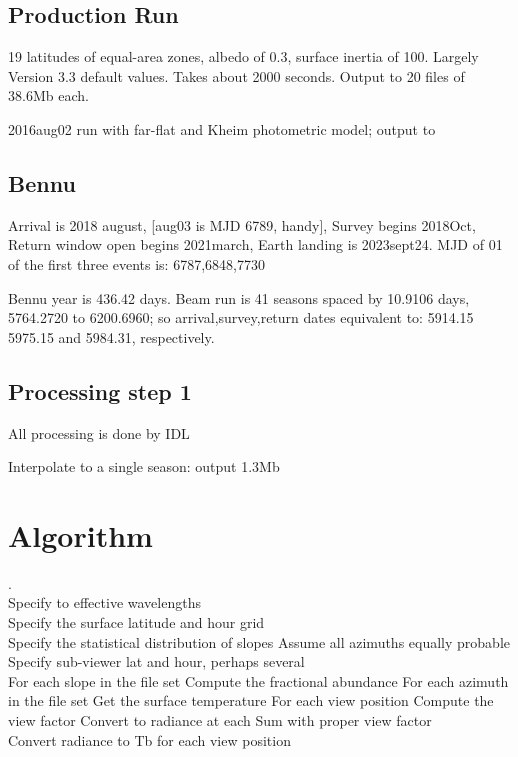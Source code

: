 \documentclass{article}
\begin{document}
\subsection{Production Run}  %
19 latitudes of equal-area zones, albedo of 0.3, surface inertia of 100. 
Largely Version 3.3 default values. Takes about 2000 seconds. Output to 
20 files of 38.6Mb each. 

2016aug02 run with far-flat and Kheim photometric model; output to 


\subsection{Bennu}  %
Arrival is 2018 august, [aug03 is MJD 6789, handy], Survey begins 2018Oct,
Return window open begins 2021march, Earth landing is 2023sept24. MJD of 01 of
the first three events is: 6787,6848,7730

Bennu year is 436.42 days.  Beam run is 41 seasons spaced by 10.9106 days,
 5764.2720 to 6200.6960; so arrival,survey,return dates equivalent to:  5914.15      5975.15 and 5984.31, respectively.

\subsection{Processing step 1} 
All processing is done by IDL 

Interpolate to a single season: output 1.3Mb

\pagebreak
\section{Algorithm}  %
.
\\ Specify to effective wavelengths
\\ Specify the surface latitude and hour grid
\\ Specify the statistical distribution of slopes
 \qii Assume all azimuths equally probable 
\\ Specify sub-viewer lat and hour, perhaps several
\\ For each slope in the file set
\qi Compute the fractional abundance
\qi For each azimuth in the file set
\qiii Get the surface temperature
\qiii For each view position
\qiiii Compute the view factor
\qiiii Convert to radiance at each
\qiiii Sum with proper view factor
\\ Convert radiance to Tb for each view position
\end{document}
